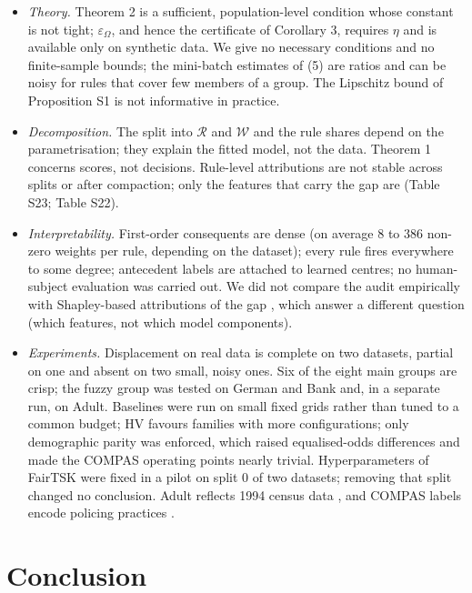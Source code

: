 \documentclass[pdflatex,sn-basic,Numbered,lineno]{sn-jnl}
\providecommand{\tightlist}{\setlength{\itemsep}{0pt}\setlength{\parskip}{0pt}}
\begin{document}
\begin{itemize}
\tightlist
\item
  \emph{Theory.} Theorem 2 is a sufficient, population-level condition whose constant is not tight; \(\varepsilon_\Omega\), and hence the certificate of Corollary 3, requires \(\eta\) and is available only on synthetic data. We give no necessary conditions and no finite-sample bounds; the mini-batch estimates of (5) are ratios and can be noisy for rules that cover few members of a group. The Lipschitz bound of Proposition S1 is not informative in practice.
\item
  \emph{Decomposition.} The split into \(\mathcal R\) and \(\mathcal W\) and the rule shares depend on the parametrisation; they explain the fitted model, not the data. Theorem 1 concerns scores, not decisions. Rule-level attributions are not stable across splits or after compaction; only the features that carry the gap are (Table S23; Table S22).
\item
  \emph{Interpretability.} First-order consequents are dense (on average 8 to 386 non-zero weights per rule, depending on the dataset); every rule fires everywhere to some degree; antecedent labels are attached to learned centres; no human-subject evaluation was carried out. We did not compare the audit empirically with Shapley-based attributions of the gap \cite{begley}, which answer a different question (which features, not which model components).
\item
  \emph{Experiments.} Displacement on real data is complete on two datasets, partial on one and absent on two small, noisy ones. Six of the eight main groups are crisp; the fuzzy group was tested on German and Bank and, in a separate run, on Adult. Baselines were run on small fixed grids rather than tuned to a common budget; HV favours families with more configurations; only demographic parity was enforced, which raised equalised-odds differences and made the COMPAS operating points nearly trivial. Hyperparameters of FairTSK were fixed in a pilot on split 0 of two datasets; removing that split changed no conclusion. Adult reflects 1994 census data \cite{ding}, and COMPAS labels encode policing practices \cite{compas}.
\end{itemize}

\hypertarget{conclusion}{%
\section{Conclusion}\label{conclusion}}
\end{document}
